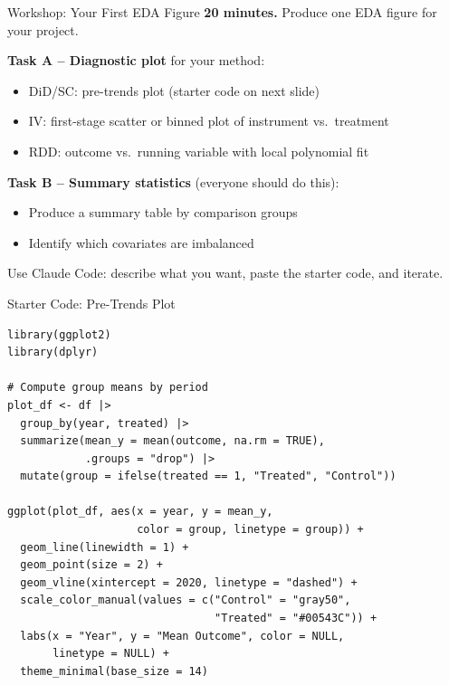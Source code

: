 \begin{frame}{Workshop: Your First EDA Figure}
  \textbf{\textcolor{usfgreen}{20 minutes.}} Produce one EDA figure for your project.

  \vspace{8pt}

  \textbf{Task A -- Diagnostic plot} for your method:
  \begin{itemize}
    \item DiD/SC: pre-trends plot (starter code on next slide)
    \item IV: first-stage scatter or binned plot of instrument vs.\ treatment
    \item RDD: outcome vs.\ running variable with local polynomial fit
  \end{itemize}

  \vspace{6pt}

  \textbf{Task B -- Summary statistics} (everyone should do this):
  \begin{itemize}
    \item Produce a summary table by comparison groups
    \item Identify which covariates are imbalanced
  \end{itemize}

  \vspace{6pt}

  Use Claude Code: describe what you want, paste the starter code, and iterate.
\end{frame}

\begin{frame}[fragile]{Starter Code: Pre-Trends Plot}
\begin{lstlisting}[style=terminal, basicstyle=\ttfamily\scriptsize\color{darkgray}]
library(ggplot2)
library(dplyr)

# Compute group means by period
plot_df <- df |>
  group_by(year, treated) |>
  summarize(mean_y = mean(outcome, na.rm = TRUE),
            .groups = "drop") |>
  mutate(group = ifelse(treated == 1, "Treated", "Control"))

ggplot(plot_df, aes(x = year, y = mean_y,
                    color = group, linetype = group)) +
  geom_line(linewidth = 1) +
  geom_point(size = 2) +
  geom_vline(xintercept = 2020, linetype = "dashed") +
  scale_color_manual(values = c("Control" = "gray50",
                                "Treated" = "#00543C")) +
  labs(x = "Year", y = "Mean Outcome", color = NULL,
       linetype = NULL) +
  theme_minimal(base_size = 14)
\end{lstlisting}
\end{frame}

